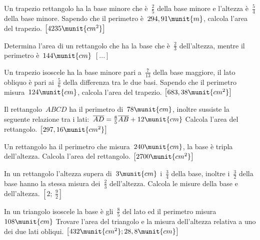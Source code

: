 \begin{htmulticols}{2}
\begin{esercizio}[*]
\label{ese:14.89}
Un trapezio rettangolo ha la base minore che è~\(\frac{2}{5}\) della base minore 
e 
l'altezza è~\(\frac{5}{4}\) della base minore. Sapendo che il perimetro 
è~\(294,91\munit{m}\), calcola l'area del trapezio. 
\hfill \(\left[4235\munit{cm^2}\right]\)
\end{esercizio}

\begin{esercizio}[*]
\label{ese:14.90}
Determina l'area di un rettangolo che ha la base che è~\(\frac{2}{3}\) 
dell'altezza, mentre il perimetro è~\(144\munit{cm}\) \hfill 
\(\left[...\right]\)
\end{esercizio}

\begin{esercizio}[*]
\label{ese:14.91}
Un trapezio isoscele ha la base minore pari a~\(\frac{7}{13}\) della base 
maggiore, il lato obliquo è pari ai~\(\frac{5}{6}\) della differenza tra le due 
basi. Sapendo che il perimetro misura~\(124\munit{cm}\), calcola l'area del 
trapezio. \hfill \(\left[683,38\munit{cm^2}\right]\)
\end{esercizio}

\begin{esercizio}[*]
\label{ese:14.92}
Il rettangolo~\(ABCD\) ha il perimetro di~\(78\munit{cm}\), inoltre sussiste la 
seguente relazione tra i 
lati:~\(\overline{AD}=\frac{8}{5}\overline{AB}+12\munit{cm}\) Calcola l'area 
del 
rettangolo. \hfill \(\left[297,16\munit{cm^2}\right]\)
\end{esercizio}

\begin{esercizio}[*]
\label{ese:14.93}
Un rettangolo ha il perimetro che misura~\(240\munit{cm}\), la base è tripla 
dell'altezza. Calcola l'area del rettangolo. 
\hfill \(\left[2700\munit{cm^2}\right]\)
\end{esercizio}

\begin{esercizio}[*]
\label{ese:14.94}
In un rettangolo l'altezza supera di~\(3\munit{cm}\) i~\(\frac{3}{4}\) della 
base, 
inoltre i~\(\frac{3}{2}\) della base hanno la stessa misura dei~\(\frac{2}{3}\) 
dell'altezza. Calcola le misure della base e dell'altezza.
 \hfill \(\left[2;~\frac{9}{2}\right]\)
\end{esercizio}

\begin{esercizio}[*]
\label{ese:14.95}
In un triangolo isoscele la base è gli~\(\frac{8}{5}\) del lato ed il perimetro 
misura~\(108\munit{cm}\) Trovare l'area del triangolo e la misura dell'altezza 
relativa a uno dei due lati obliqui. 
\hfill \(\left[432\munit{cm^2}; 28,8\munit{cm}\right]\)
\end{esercizio}


\end{htmulticols}
